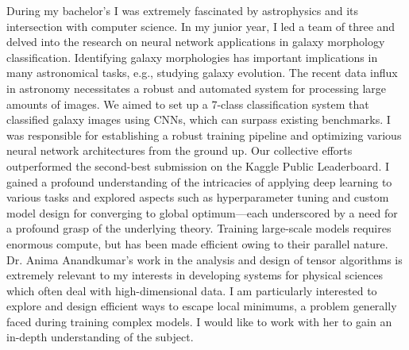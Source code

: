 \documentclass{article}
\begin{document}
\hspace{0.25in}During my bachelor's I was extremely fascinated by astrophysics
and its intersection with computer science. In my junior year, I led a team of
three and delved into the research on neural network applications in galaxy
morphology classification. Identifying galaxy morphologies has important
implications in many astronomical tasks, e.g., studying galaxy evolution. The
recent data influx in astronomy necessitates a robust and automated system for
processing large amounts of images. We aimed to set up a 7-class classification
system that classified galaxy images using CNNs, which can surpass existing
benchmarks. I was responsible for establishing a robust training pipeline and
optimizing various neural network architectures from the ground up. Our
collective efforts outperformed the second-best submission on the Kaggle Public
Leaderboard. I gained a profound understanding of the intricacies of applying
deep learning to various tasks and explored aspects such as hyperparameter
tuning and custom model design for converging to global optimum—each underscored
by a need for a profound grasp of the underlying theory. Training large-scale
models requires enormous compute, but has been made efficient owing to their
parallel nature. Dr. Anima Anandkumar's work in the analysis and design of
tensor algorithms is extremely relevant to my interests in developing systems
for physical sciences which often deal with high-dimensional data. I am
particularly interested to explore and design efficient ways to escape local
minimums, a problem generally faced during training complex models. I would like
to work with her to gain an in-depth understanding of the subject.\vspace{5pt}
\end{document}
